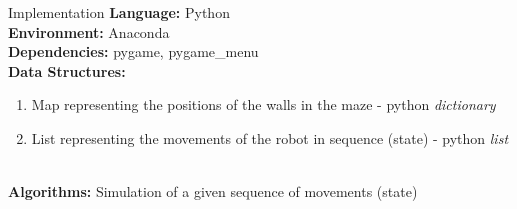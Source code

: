 


\begin{frame}{Implementation}
    \textbf{Language:} Python \\
    \textbf{Environment:} Anaconda \\
    \textbf{Dependencies:} pygame, pygame\_menu \\
    \textbf{Data Structures:} 
    \begin{enumerate}
        \item Map representing the positions of the walls in the maze - python \textit{dictionary}
        \item List representing the movements of the robot in sequence (state) - python \textit{list}
    \end{enumerate}\\
    \textbf{Algorithms:} Simulation of a given sequence of movements (state)\\
\end{frame}
